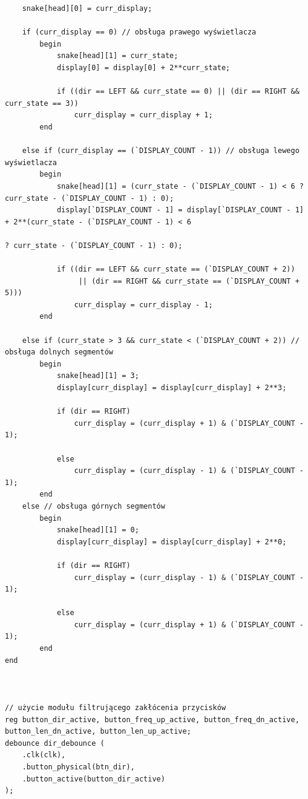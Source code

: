 \documentclass[a4paper]{article}
\begin{document}
\begin{verbatim}
    snake[head][0] = curr_display;

    if (curr_display == 0) // obsługa prawego wyświetlacza
        begin           
            snake[head][1] = curr_state;
            display[0] = display[0] + 2**curr_state;
            
            if ((dir == LEFT && curr_state == 0) || (dir == RIGHT && curr_state == 3))
                curr_display = curr_display + 1;
        end
    
    else if (curr_display == (`DISPLAY_COUNT - 1)) // obsługa lewego wyświetlacza
        begin
            snake[head][1] = (curr_state - (`DISPLAY_COUNT - 1) < 6 ? curr_state - (`DISPLAY_COUNT - 1) : 0);
            display[`DISPLAY_COUNT - 1] = display[`DISPLAY_COUNT - 1] + 2**(curr_state - (`DISPLAY_COUNT - 1) < 6 
                                                                            ? curr_state - (`DISPLAY_COUNT - 1) : 0);
            
            if ((dir == LEFT && curr_state == (`DISPLAY_COUNT + 2)) 
                 || (dir == RIGHT && curr_state == (`DISPLAY_COUNT + 5)))
                curr_display = curr_display - 1;
        end
                
    else if (curr_state > 3 && curr_state < (`DISPLAY_COUNT + 2)) // obsługa dolnych segmentów
        begin
            snake[head][1] = 3;
            display[curr_display] = display[curr_display] + 2**3;
            
            if (dir == RIGHT)
                curr_display = (curr_display + 1) & (`DISPLAY_COUNT - 1);
            
            else
                curr_display = (curr_display - 1) & (`DISPLAY_COUNT - 1);
        end
    else // obsługa górnych segmentów
        begin
            snake[head][1] = 0;
            display[curr_display] = display[curr_display] + 2**0;
            
            if (dir == RIGHT)
                curr_display = (curr_display - 1) & (`DISPLAY_COUNT - 1);

            else
                curr_display = (curr_display + 1) & (`DISPLAY_COUNT - 1);
        end
end



// użycie modułu filtrującego zakłócenia przycisków
reg button_dir_active, button_freq_up_active, button_freq_dn_active, button_len_dn_active, button_len_up_active;
debounce dir_debounce ( 
    .clk(clk),
    .button_physical(btn_dir),
    .button_active(button_dir_active)
);


\end{verbatim}
\end{document}
